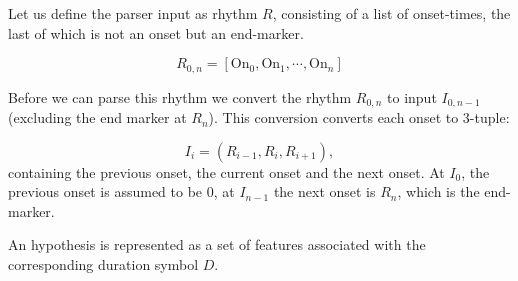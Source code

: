 \documentclass[a4paper,10pt]{article}
\begin{document}
Let us define the parser input as rhythm $R$, consisting of a list of onset-times, the last of which is not an onset but an end-marker. 

\begin{equation}
R_{0,n} = [\textrm{On}_0, \textrm{On}_{1}, \cdots, \textrm{On}_n]
\end{equation}

Before we can parse this rhythm we convert the rhythm $R_{0,n}$ to input $I_{0,n-1}$ (excluding the end marker at $R_n$). This conversion converts each onset to 3-tuple:

\begin{equation}
I_i = (R_{i-1}, R_i, R_{i+1}),
\end{equation}
containing the previous onset, the current onset and the next onset. At $I_0$, the previous onset is assumed to be $0$, at $I_{n-1}$ the next onset is $R_n$, which is the end-marker. 

An hypothesis is represented as a set of features associated with the corresponding duration symbol $D$. 






\end{document}

